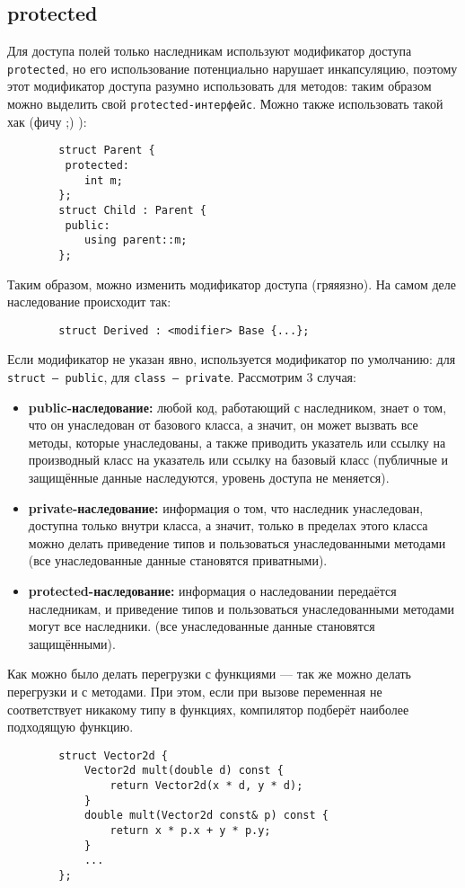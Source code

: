 \documentclass[15pt, a4paper]{article}
\newcommand{\nl}{\newline}
\begin{document}
  \subsection{protected}
    Для доступа полей только наследникам используют модификатор доступа \texttt{protected}, но его
    использование потенциально нарушает инкапсуляцию, поэтому этот модификатор доступа разумно
    использовать для методов: таким образом можно выделить свой \texttt{protected-интерфейс}.\nl
    Можно также использовать такой хак (фичу ;) ):
    \begin{verbatim}
        struct Parent {
         protected:
            int m;
        };
        struct Child : Parent {
         public:
            using parent::m;
        };
    \end{verbatim}
    Таким образом, можно изменить модификатор доступа (гряяязно).\nl
    На самом деле наследование происходит так:
    \begin{verbatim}
        struct Derived : <modifier> Base {...};
    \end{verbatim}
    Если модификатор не указан явно, используется модификатор по умолчанию: для \texttt{struct --- public}, для
    \texttt{class --- private}.\nl
    Рассмотрим 3 случая:
    \begin{itemize}
\item \textbf{public-наследование:} любой код, работающий с наследником, знает о том, что он унаследован от базового класса, а значит, он может вызвать все методы, которые унаследованы, а также приводить указатель или ссылку на производный класс на указатель или ссылку на базовый класс (публичные и защищённые данные наследуются, уровень доступа не меняется).
\item \textbf{private-наследование:} информация о том, что наследник унаследован, доступна только внутри класса, а значит, только в пределах этого класса можно делать приведение типов и пользоваться унаследованными методами (все унаследованные данные становятся приватными).
\item \textbf{protected-наследование:} информация о наследовании передаётся наследникам, и приведение типов и пользоваться унаследованными методами могут все наследники. (все унаследованные данные становятся защищёнными).
    \end{itemize}
    Как можно было делать перегрузки с функциями --- так же можно делать перегрузки и с методами. При этом,
    если при вызове переменная не соответствует никакому типу в функциях, компилятор подберёт наиболее
    подходящую функцию.
    \begin{verbatim}
        struct Vector2d {
            Vector2d mult(double d) const {
                return Vector2d(x * d, y * d);
            }
            double mult(Vector2d const& p) const {
                return x * p.x + y * p.y;
            }
            ...
        };
    \end{verbatim}
\end{document}
